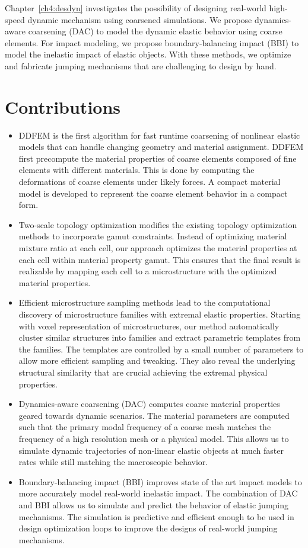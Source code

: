 Chapter~\ref{ch4:desdyn} investigates the possibility of designing real-world high-speed dynamic mechanism using coarsened simulations.
We propose dynamics-aware coarsening (DAC) to model the dynamic elastic behavior using coarse elements.
For impact modeling, we propose boundary-balancing impact (BBI) to model the inelastic impact of elastic objects.
With these methods, we optimize and fabricate jumping mechanisms that are challenging to design by hand.
\section{Contributions}
\begin{itemize}
	\item DDFEM is the first algorithm for fast runtime coarsening of nonlinear elastic models that can handle changing geometry and material assignment.
	DDFEM first precompute the material properties of coarse elements composed of fine elements with different materials.
	This is done by computing the deformations of coarse elements under likely forces.
	A compact material model is developed to represent the coarse element behavior in a compact form.
	\item Two-scale topology optimization modifies the existing topology optimization methods to incorporate gamut constraints.
	Instead of optimizing material mixture ratio at each cell, our approach optimizes the material properties at each cell within material property gamut.
	This ensures that the final result is realizable by mapping each cell to a microstructure with the optimized material properties.
	\item Efficient microstructure sampling methods lead to the computational discovery of microstructure families with extremal elastic properties.
	Starting with voxel representation of microstructures,
	our method automatically cluster similar structures into families and extract parametric templates from the families.
	The templates are controlled by a small number of parameters to allow more efficient sampling and tweaking.
	They also reveal the underlying structural similarity that are crucial achieving the extremal physical properties.	
	\item Dynamics-aware coarsening (DAC) computes coarse material properties geared towards dynamic scenarios.
	The material parameters are computed such that the primary modal frequency
	of a coarse mesh matches the frequency of a high resolution mesh or a physical model.
	This allows us to simulate dynamic trajectories of non-linear elastic objects at much faster rates while still matching the macroscopic behavior.
	\item Boundary-balancing impact (BBI) improves state of the art impact models to more accurately model real-world inelastic impact.
	The combination of DAC and BBI allows us to simulate and predict the behavior of elastic jumping mechanisms.
	The simulation is predictive and efficient enough to be used in design optimization loops to improve the designs of real-world jumping mechanisms.
\end{itemize}